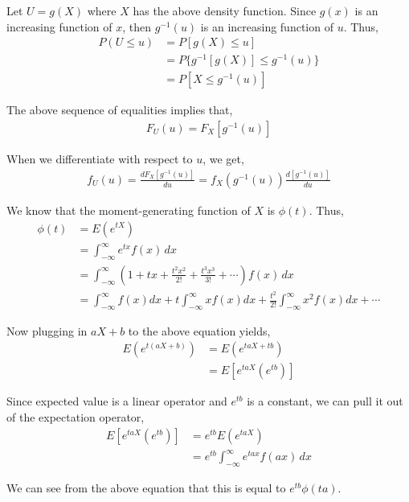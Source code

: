 \documentclass[12pt]{article}
\newenvironment{problem}[2][Problem]{\begin{trivlist}
\item[\hskip \labelsep {\bfseries #1}\hskip \labelsep {\bfseries #2.}]}{\end{trivlist}}
\begin{document}
Let $U = g(X)$ where $X$ has the above density function. Since $g(x)$ is an increasing function of $x$, then $g^{-1}(u)$ is an increasing function of $u$. Thus,
\begin{align*}
P(U \leq u) &= P[g(X) \leq u]\\
&= P\{g^{-1}[g(X)] \leq g^{-1}(u)\}\\
&= P[X \leq g^{-1}(u)]
\end{align*}

The above sequence of equalities implies that,
\begin{align*}
F_U(u) = F_X[g^{-1}(u)]
\end{align*}

When we differentiate with respect to $u$, we get,
\begin{align*}
f_U(u) = \frac{dF_X[g^{-1}(u)]}{du} = f_X(g^{-1}(u))\frac{d[g^{-1}(u)]}{du}
\end{align*}

\begin{problem}{5}
\end{problem}

We know that the moment-generating function of $X$ is $\phi(t)$. Thus, 
\begin{align*}
\phi(t) &= E(e^{tX})\\
&= \int_{-\infty}^{\infty} e^{tx} f(x) \, dx\\
&= \int_{-\infty}^{\infty} \left(1 + tx + \frac{t^2x^2}{2!} + \frac{t^3x^3}{3!} + \cdots \right) f(x) \, dx\\
&= \int_{-\infty}^{\infty} f(x) dx + t \int_{-\infty}^{\infty} xf(x)dx + \frac{t^2}{2!} \int_{-\infty}^{\infty} x^2f(x)dx + \cdots
\end{align*}

Now plugging in $aX + b$ to the above equation yields,
\begin{align*}
E(e^{t(aX+b)}) &= E(e^{taX + tb})\\
&= E[e^{taX}(e^{tb})]
\end{align*}

Since expected value is a linear operator and $e^{tb}$ is a constant, we can pull it out of the expectation operator,
\begin{align*}
E[e^{taX}(e^{tb})] &= e^{tb} E(e^{taX})\\
&= e^{tb} \int_{-\infty}^{\infty} e^{tax} f(ax) \, dx
\end{align*}

We can see from the above equation that this is equal to $e^{tb}\phi(ta)$.\\
\end{document}
